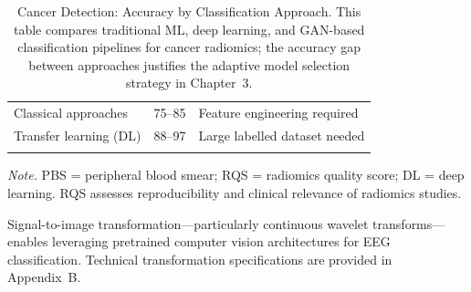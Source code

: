 \begin{table}[H]
\tablestripes\tablefontsize
\tablefontsize
\caption[Cancer Detection: Accuracy by Classification Approach]{Cancer Detection: Accuracy by Classification Approach. This table compares traditional ML, deep learning, and GAN-based classification pipelines for cancer radiomics; the accuracy gap between approaches justifies the adaptive model selection strategy in Chapter~3.}
\begin{tabularx}{\textwidth}{@{} l C L @{}}
\toprule
{} &  &  \\
\midrule
Classical approaches & 75--85 & Feature engineering required \\
Transfer learning (DL) & 88--97 & Large labelled dataset needed \\
\addlinespace
{} \\
\bottomrule
\end{tabularx}
\vspace{0.5em}\noindent\textit{Note.} PBS = peripheral blood smear; RQS = radiomics quality score; DL = deep learning. RQS assesses reproducibility and clinical relevance of radiomics studies.
\end{table}
\fi %

%

\noindent Signal-to-image transformation---particularly continuous wavelet transforms---enables leveraging pretrained computer vision architectures for EEG classification. Technical transformation specifications are provided in Appendix~B.

